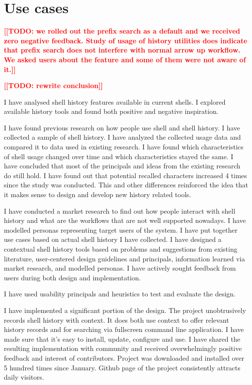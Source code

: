 \documentclass[thesis=M,english]{FITthesis}[2012/10/20]
\newcommand{\todotext}[1]{\textcolor{red}{\textbf{[[#1]]}}}
\begin{document}
\section{Use cases}

\todotext{TODO: we rolled out the prefix search as a default and we received zero negative feedback. Study of usage of history utilities does indicate that prefix search does not interfere with normal arrow up workflow. We asked users about the feature and some of them were not aware of it.}


\begin{conclusion}

\todotext{TODO: rewrite conclusion}

I have analysed shell history features available in current shells. I explored available history tools and found both positive and negative inspiration.

\par I have found previous research on how people use shell and shell history.  
I have collected a sample of shell history. I have analyzed the collected usage data and compared it to data used in existing research. I have found which characteristics of shell usage changed over time and which characteristics stayed the same. I have concluded that most of the principals and ideas from the existing research do still hold. I have found out that potential recalled characters increased 4 times since the study was conducted. This and other differences reinforced the idea that it makes sense to design and develop new history related tools. 

\par I have conducted a market research to find out how people interact with shell history and what are the workflows that are not well supported nowadays. I have modelled personas representing target users of the system. I have put together use cases based on actual shell history I have collected.
I have designed a contextual shell history tools based on problems and suggestions from existing literature, user-centered design guidelines and principals, information learned via market research, and modelled personas.
I have actively sought feedback from users during both design and implementation. 

I have used usability principals and heuristics to test and evaluate the design.

\par I have implemented a significant portion of the design. The project unobtrusively records shell history with context. It does both use context to offer relevant history records and for searching via fullscreen command line application.
I have made sure that it's easy to install, update, configure and use. I have shared the resulting implementation with community and received overwhelmingly positive feedback and interest of contributors. Project was downloaded and installed over 5 hundred times since January. Github page of the project consistently attracts daily visitors.  


\end{conclusion}
\end{document}
